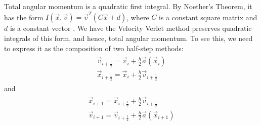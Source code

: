 \documentclass[../Main.tex]{subfiles}
\begin{document}
Total angular momentum is a quadratic first integral. By Noether's Theorem, it has the form $I(\vec{x}, \vec{v}) = \vec{v}^{T}\left(C\vec{x} + d\right)$, where $C$ is a constant square matrix and $d$ is a constant vector \cite{HarierLubichWanner2003}.
We have the Velocity Verlet method preserves quadratic integrals of this form, and hence, total angular momentum. To see this, we need to express it as the composition of two half-step methods:
\begin{align}
	\begin{split}
		\vec{v}_{i+\frac{1}{2}} = \vec{v}_{i} + \frac{h}{2}\vec{a}(\vec{x}_{i}) \\
		\vec{x}_{i+\frac{1}{2}} = \vec{x}_{i} + \frac{h}{2}\vec{v}_{i+\frac{1}{2}}
	\end{split}
\end{align}
and
\begin{align}
	\begin{split}
		\vec{x}_{i+1} = \vec{x}_{i+ \frac{1}{2}} + \frac{h}{2}\vec{v}_{i+\frac{1}{2}} \\
		\vec{v}_{i+1} = \vec{v}_{i+\frac{1}{2}} + \frac{h}{2}\vec{a}(\vec{x}_{i+1})
	\end{split} \label{velocity_verlet_split_2}
\end{align}
\end{document}
